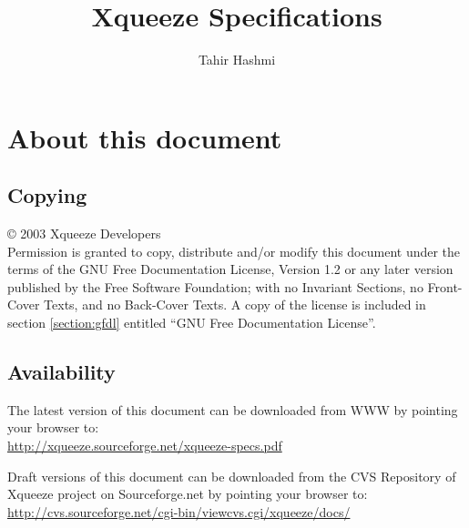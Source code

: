 \documentclass[a4paper]{article}
\title{Xqueeze Specifications}
\author{Tahir Hashmi}
\begin{document}
\maketitle
\tableofcontents
\section{About this document}

\subsection{Copying}
\copyright{} 2003 Xqueeze Developers \\

Permission is granted to copy, distribute and/or modify this
document under the terms of the GNU Free Documentation License,
Version 1.2 or any later version published by the Free Software
Foundation; with no Invariant Sections, no Front-Cover Texts, and no
Back-Cover Texts. A copy of the license is included in section
\ref{section:gfdl} entitled ``GNU Free Documentation License''.

\subsection{Availability}
The latest version of this document can be downloaded from WWW by
pointing your browser to: \\
\href{http://xqueeze.sourceforge.net/xqueeze-specs.pdf}{http://xqueeze.sourceforge.net/xqueeze-specs.pdf}

Draft versions of this document can be downloaded from the CVS
Repository of Xqueeze project on Sourceforge.net by pointing your
browser to: \\
\href{http://cvs.sourceforge.net/cgi-bin/viewcvs.cgi/xqueeze/docs/}{http://cvs.sourceforge.net/cgi-bin/viewcvs.cgi/xqueeze/docs/}
\end{document}
